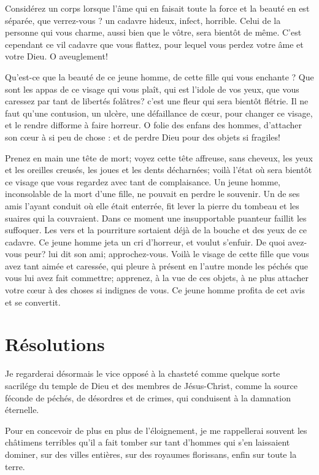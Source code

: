 \documentclass[instructions.tex]{subfiles}
\begin{document}
Considérez un corps lorsque l’âme qui en faisait toute la force et la beauté en est séparée, que verrez-vous ? un cadavre hideux, infect, horrible. Celui de la personne qui vous charme, aussi bien que le vôtre, sera bientôt de même. C’est cependant ce vil cadavre que vous flattez, pour lequel vous perdez votre âme et votre Dieu. O aveuglement!
 
Qu’est-ce que la beauté de ce jeune homme, de cette fille qui vous enchante ? Que sont les appas de ce visage qui vous plaît, qui est l’idole de vos yeux, que vous caressez par tant de libertés folâtres? c’est une fleur qui sera bientôt flétrie. Il ne faut qu’une contusion, un ulcère, une défaillance de cœur, pour changer ce visage, et le rendre difforme à faire horreur. O folie des enfans des hommes, d’attacher son cœur à si peu de chose : et de perdre Dieu pour des objets si fragiles!
 
Prenez en main une tête de mort; voyez cette tête affreuse, sans cheveux, les yeux et les oreilles creusés, les joues et les dents décharnées; voilà l’état où sera bientôt ce visage que vous regardez avec tant de complaisance. Un jeune homme, inconsolable de la mort d’une fille, ne pouvait en perdre le souvenir. Un de ses amis l’ayant conduit où elle était enterrée, fit lever la pierre du tombeau et les suaires qui la couvraient. Dans ce moment une insupportable puanteur faillit les suffoquer. Les vers et la pourriture sortaient déjà de la bouche et des yeux de ce cadavre. Ce jeune homme jeta un cri d’horreur, et voulut s’enfuir. De quoi avez-vous peur? lui dit son ami; approchez-vous. Voilà le visage de cette fille que vous avez tant aimée et caressée, qui pleure à présent en l’autre monde les péchés que vous lui avez fait commettre; apprenez, à la vue de ces objets, à ne plus attacher votre cœur à des choses si indignes de vous. Ce jeune homme profita de cet avis et se convertit.
 
\section{Résolutions}
 
\primo Je regarderai désormais le vice opposé à la chasteté comme quelque sorte sacrilége du temple de Dieu et des membres de Jésus-Christ, comme la source féconde de péchés, de désordres et de crimes, qui conduisent à la damnation éternelle.
 
\secundo Pour en concevoir de plus en plus de l’éloignement, je me rappellerai souvent les châtimens terribles qu’il a fait tomber sur tant d’hommes qui s’en laissaient dominer, sur des villes entières, sur des royaumes florissans, enfin sur toute la terre.

 
\end{document}
